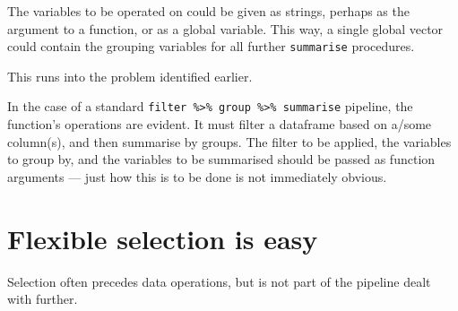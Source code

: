 \documentclass[]{book}
\newenvironment{Shaded}{}{}
\newcommand{\CommentTok}[1]{\textcolor[rgb]{0.38,0.63,0.69}{\textit{#1}}}
\newcommand{\DataTypeTok}[1]{\textcolor[rgb]{0.56,0.13,0.00}{#1}}
\newcommand{\KeywordTok}[1]{\textcolor[rgb]{0.00,0.44,0.13}{\textbf{#1}}}
\newcommand{\NormalTok}[1]{#1}
\newcommand{\OperatorTok}[1]{\textcolor[rgb]{0.40,0.40,0.40}{#1}}
\newcommand{\StringTok}[1]{\textcolor[rgb]{0.25,0.44,0.63}{#1}}
\begin{document}
The variables to be operated on could be given as strings, perhaps as the argument to a function, or as a global variable. This way, a single global vector could contain the grouping variables for all further \texttt{summarise} procedures.

This runs into the problem identified earlier.

\begin{Shaded}
\end{Shaded}

In the case of a standard \texttt{filter\ \%\textgreater{}\%\ group\ \%\textgreater{}\%\ summarise} pipeline, the function's operations are evident. It must filter a dataframe based on a/some column(s), and then summarise by groups. The filter to be applied, the variables to group by, and the variables to be summarised should be passed as function arguments --- just how this is to be done is not immediately obvious.

\hypertarget{flexible-selection-is-easy}{%
\section{Flexible selection is easy}\label{flexible-selection-is-easy}}

Selection often precedes data operations, but is not part of the pipeline dealt with further.
\end{document}
